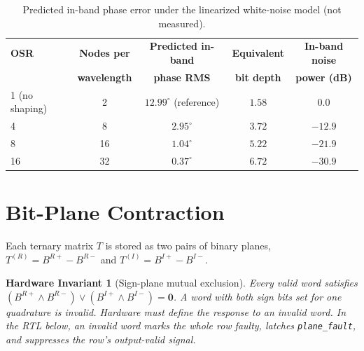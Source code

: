 \documentclass[10pt, twocolumn, a4paper]{article}
\newtheorem{invariant}{Hardware Invariant}
\begin{document}
\begin{table}[t]
\centering
\caption{Predicted in-band phase error under the linearized white-noise model (not measured).}
\vspace{4pt}
\footnotesize
\begin{tabular}{@{}lcccc@{}}
\toprule
\textbf{OSR} & \textbf{Nodes per} & \textbf{Predicted in-band} & \textbf{Equivalent} & \textbf{In-band noise} \\
 & \textbf{wavelength} & \textbf{phase RMS} & \textbf{bit depth} & \textbf{power (dB)} \\
\midrule
1 (no shaping) & 2 & $12.99^\circ$ (reference) & $1.58$ & $0.0$ \\
4 & 8 & $2.95^\circ$ & $3.72$ & $-12.9$ \\
8 & 16 & $1.04^\circ$ & $5.22$ & $-21.9$ \\
16 & 32 & $0.37^\circ$ & $6.72$ & $-30.9$ \\
\bottomrule
\end{tabular}
\label{tab:osr}
\end{table}

\section{Bit-Plane Contraction}

Each ternary matrix $T$ is stored as two pairs of binary planes, $T^{(R)}=B^{R+}-B^{R-}$ and $T^{(I)}=B^{I+}-B^{I-}$.

\begin{invariant}[Sign-plane mutual exclusion]
Every valid word satisfies $(B^{R+}\land B^{R-})\lor(B^{I+}\land B^{I-})=\mathbf{0}$. A word with both sign bits set for one quadrature is invalid. Hardware must define the response to an invalid word. In the RTL below, an invalid word marks the whole row faulty, latches \texttt{plane\_fault}, and suppresses the row's output-valid signal.
\end{invariant}
\end{document}
